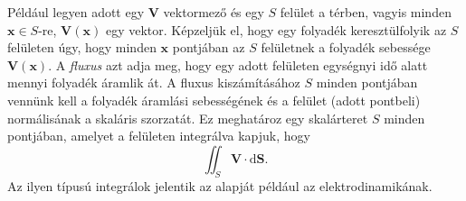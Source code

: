 \documentclass[%
	DIV=15,appendixprefix]{scrreprt}
\theoremstyle{definition}
\theoremstyle{remark}
\begin{document}
Például legyen adott egy $ \mathbf{ V } $ vektormező és egy $ S $ felület a térben, vagyis minden
$ \mathbf{ x } \in S $-re, $ \mathbf{ V } \left( \mathbf{ x } \right) $ egy vektor. Képzeljük el,
hogy egy folyadék keresztülfolyik az $ S $ felületen úgy, hogy minden $ \mathbf{ x } $ pontjában az
$ S $ felületnek a folyadék sebessége $ \mathbf{ V } \left( \mathbf{ x } \right) $. A \emph{fluxus}
azt adja meg, hogy egy adott felületen egységnyi idő alatt mennyi folyadék áramlik át. A fluxus
kiszámításához $ S $ minden pontjában vennünk kell a folyadék áramlási sebességének és a felület
(adott pontbeli) normálisának a skaláris szorzatát. Ez meghatároz egy skalárteret $ S $ minden
pontjában, amelyet a felületen integrálva kapjuk, hogy
\begin{equation*}
	\iint_{ S } \mathbf{ V } \cdot \mathrm{ d } \mathbf{ S }.
\end{equation*}
Az ilyen típusú integrálok jelentik az alapját például az elektrodinamikának.
\end{document}
